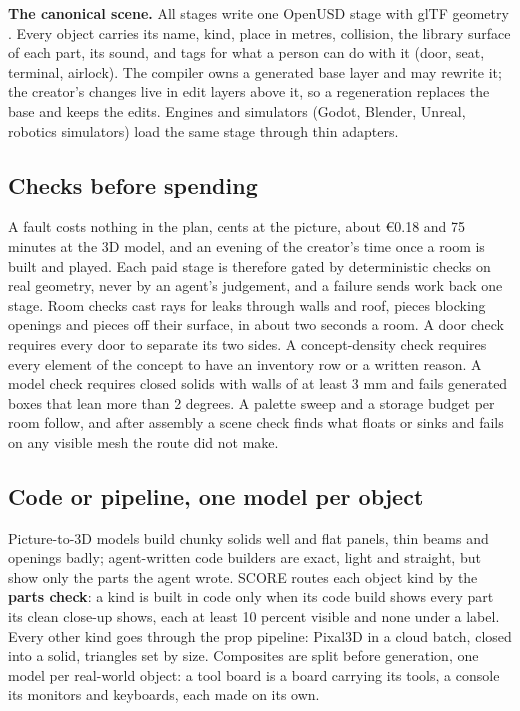 \textbf{The canonical scene.} All stages write one OpenUSD stage \citep{openusd} with glTF geometry \citep{gltf2}. Every object carries its name, kind, place in metres, collision, the library surface of each part, its sound, and tags for what a person can do with it (door, seat, terminal, airlock). The compiler owns a generated base layer and may rewrite it; the creator's changes live in edit layers above it, so a regeneration replaces the base and keeps the edits. Engines and simulators (Godot, Blender, Unreal, robotics simulators) load the same stage through thin adapters.

\subsection{Checks before spending}\label{checks-before-spending}

A fault costs nothing in the plan, cents at the picture, about €0.18 and 75 minutes at the 3D model, and an evening of the creator's time once a room is built and played. Each paid stage is therefore gated by deterministic checks on real geometry, never by an agent's judgement, and a failure sends work back one stage. Room checks cast rays for leaks through walls and roof, pieces blocking openings and pieces off their surface, in about two seconds a room. A door check requires every door to separate its two sides. A concept-density check requires every element of the concept to have an inventory row or a written reason. A model check requires closed solids with walls of at least 3 mm and fails generated boxes that lean more than 2 degrees. A palette sweep and a storage budget per room follow, and after assembly a scene check finds what floats or sinks and fails on any visible mesh the route did not make.

\subsection{Code or pipeline, one model per object}\label{code-or-pipeline-one-model-per-object}

Picture-to-3D models build chunky solids well and flat panels, thin beams and openings badly; agent-written code builders are exact, light and straight, but show only the parts the agent wrote. SCORE routes each object kind by the \textbf{parts check}: a kind is built in code only when its code build shows every part its clean close-up shows, each at least 10 percent visible and none under a label. Every other kind goes through the prop pipeline: Pixal3D \citep{li2026pixal3d} in a cloud batch, closed into a solid, triangles set by size. Composites are split before generation, one model per real-world object: a tool board is a board carrying its tools, a console its monitors and keyboards, each made on its own.

